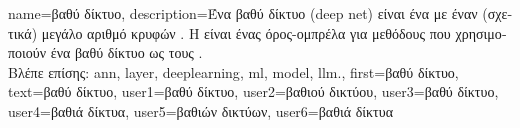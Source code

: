 {name={\foreignlanguage{greek}{βαθύ δίκτυο}},
	description={\foreignlanguage{greek}{Ένα βαθύ δίκτυο} (deep net) \foreignlanguage{greek}{είναι 
		ένα}  \foreignlanguage{greek}{με έναν (σχετικά) μεγάλο 
		αριθμό κρυφών} . \foreignlanguage{greek}{Η}  \foreignlanguage{greek}{είναι 
		ένας όρος-ομπρέλα για μεθόδους}  \foreignlanguage{greek}{που χρησιμοποιούν ένα βαθύ δίκτυο ως} 
		 \foreignlanguage{greek}{τους} \cite{Goodfellow-et-al-2016}.
		\\
		\foreignlanguage{greek}{Βλέπε επίσης:} \gls{ann}, \gls{layer}, \gls{deeplearning}, \gls{ml}, \gls{model}, \gls{llm}.},
	first={\foreignlanguage{greek}{βαθύ δίκτυο}},
	text={\foreignlanguage{greek}{βαθύ δίκτυο}},
	user1={\foreignlanguage{greek}{βαθύ δίκτυο}}, %
	user2={\foreignlanguage{greek}{βαθιού δικτύου}}, %
	user3={\foreignlanguage{greek}{βαθύ δίκτυο}}, %
	user4={\foreignlanguage{greek}{βαθιά δίκτυα}}, %
	user5={\foreignlanguage{greek}{βαθιών δικτύων}}, %
	user6={\foreignlanguage{greek}{βαθιά δίκτυα}} %
}

